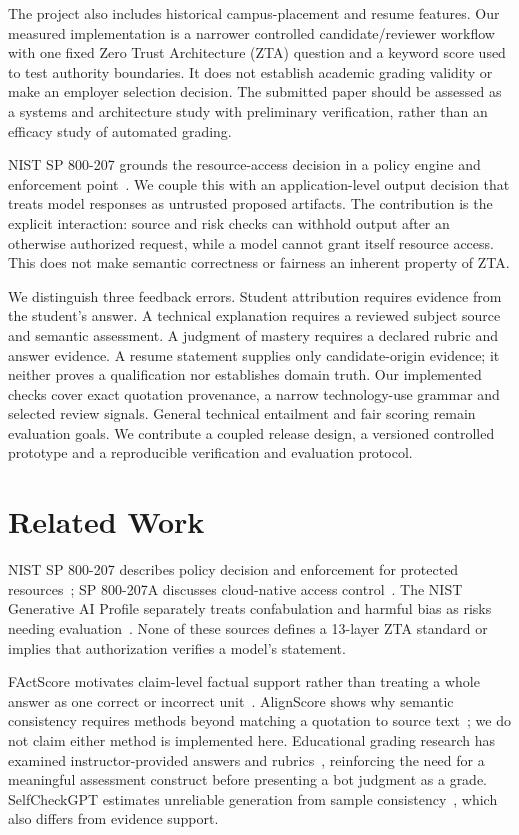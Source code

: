 \documentclass[conference]{IEEEtran}
\begin{document}
The project also includes historical campus-placement and resume features. Our measured implementation is a narrower controlled candidate/reviewer workflow with one fixed Zero Trust Architecture (ZTA) question and a keyword score used to test authority boundaries. It does not establish academic grading validity or make an employer selection decision. The submitted paper should be assessed as a systems and architecture study with preliminary verification, rather than an efficacy study of automated grading.

NIST SP 800-207 grounds the resource-access decision in a policy engine and enforcement point~\cite{rose2020zero}. We couple this with an application-level output decision that treats model responses as untrusted proposed artifacts. The contribution is the explicit interaction: source and risk checks can withhold output after an otherwise authorized request, while a model cannot grant itself resource access. This does not make semantic correctness or fairness an inherent property of ZTA.

We distinguish three feedback errors. Student attribution requires evidence from the student's answer. A technical explanation requires a reviewed subject source and semantic assessment. A judgment of mastery requires a declared rubric and answer evidence. A resume statement supplies only candidate-origin evidence; it neither proves a qualification nor establishes domain truth. Our implemented checks cover exact quotation provenance, a narrow technology-use grammar and selected review signals. General technical entailment and fair scoring remain evaluation goals. We contribute a coupled release design, a versioned controlled prototype and a reproducible verification and evaluation protocol.

\section{Related Work}
NIST SP 800-207 describes policy decision and enforcement for protected resources~\cite{rose2020zero}; SP 800-207A discusses cloud-native access control~\cite{chandramouli2023zero}. The NIST Generative AI Profile separately treats confabulation and harmful bias as risks needing evaluation~\cite{nist2024genai}. None of these sources defines a 13-layer ZTA standard or implies that authorization verifies a model's statement.

FActScore motivates claim-level factual support rather than treating a whole answer as one correct or incorrect unit~\cite{min2023factscore}. AlignScore shows why semantic consistency requires methods beyond matching a quotation to source text~\cite{zha2023alignscore}; we do not claim either method is implemented here. Educational grading research has examined instructor-provided answers and rubrics~\cite{golchin2025grading}, reinforcing the need for a meaningful assessment construct before presenting a bot judgment as a grade. SelfCheckGPT estimates unreliable generation from sample consistency~\cite{manakul2023selfcheck}, which also differs from evidence support.
\end{document}
